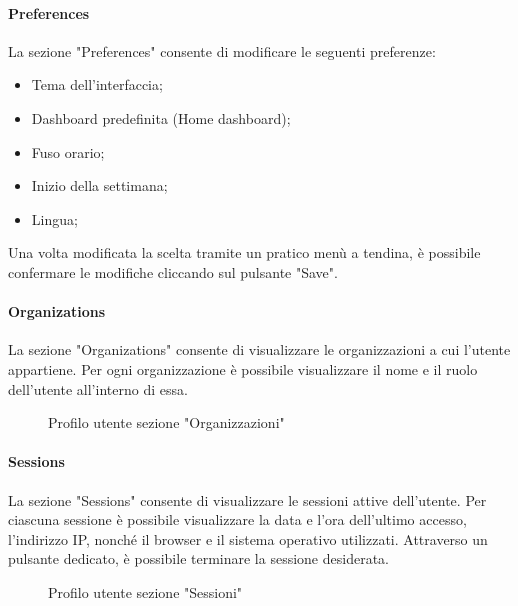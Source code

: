 \paragraph{Preferences}
La sezione "Preferences" consente di modificare le seguenti preferenze:
\begin{itemize}
    \item Tema dell'interfaccia;
    \item Dashboard predefinita (Home dashboard);
    \item Fuso orario;
    \item Inizio della settimana;
    \item Lingua;
\end{itemize}
Una volta modificata la scelta tramite un pratico menù a tendina, è possibile confermare le modifiche cliccando sul pulsante "Save". \\
\paragraph{Organizations}
La sezione "Organizations" consente di visualizzare le organizzazioni a cui l'utente appartiene. Per ogni organizzazione è possibile visualizzare il nome e il ruolo dell'utente all'interno di essa.
\begin{figure}[H]
    \centering
    \caption{Profilo utente sezione "Organizzazioni"}
    \label{fig:my_label}
\end{figure}
\paragraph{Sessions}
La sezione "Sessions" consente di visualizzare le sessioni attive dell'utente. Per ciascuna sessione è possibile visualizzare la data e l'ora dell'ultimo accesso, l'indirizzo IP, nonché il browser e il sistema operativo utilizzati. Attraverso un pulsante dedicato, è possibile terminare la sessione desiderata.
\begin{figure}[H]
    \centering
    \caption{Profilo utente sezione "Sessioni"}
    \label{fig:my_label}
\end{figure}

